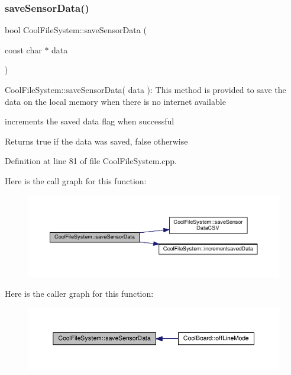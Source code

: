 \subsubsection{\texorpdfstring{save\+Sensor\+Data()}{saveSensorData()}}
{\footnotesize\ttfamily bool Cool\+File\+System\+::save\+Sensor\+Data (\begin{DoxyParamCaption}\item[{const char $\ast$}]{data }\end{DoxyParamCaption})}

Cool\+File\+System\+::save\+Sensor\+Data( data )\+: This method is provided to save the data on the local memory when there is no internet available

increments the saved data flag when successful

\begin{DoxyReturn}{Returns}
true if the data was saved, false otherwise 
\end{DoxyReturn}


Definition at line 81 of file Cool\+File\+System.\+cpp.

Here is the call graph for this function\+:\nopagebreak
\begin{figure}[H]
\begin{center}
\leavevmode
\includegraphics[width=350pt]{class_cool_file_system_afa3a4feae94871d4d3b6bebb701c2e67_cgraph}
\end{center}
\end{figure}
Here is the caller graph for this function\+:\nopagebreak
\begin{figure}[H]
\begin{center}
\leavevmode
\includegraphics[width=350pt]{class_cool_file_system_afa3a4feae94871d4d3b6bebb701c2e67_icgraph}
\end{center}
\end{figure}
\mbox{\label{class_cool_file_system_ab78704d5d21ce10fc6f1138ab5ab46c8}} 

